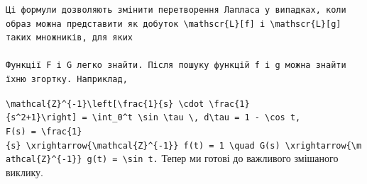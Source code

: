 \documentclass[
  ukrainian,
]{article}
\begin{document}
\begin{verbatim}
Ці формули дозволяють змінити перетворення Лапласа у випадках, коли образ можна представити як добуток \mathscr{L}[f] і \mathscr{L}[g] таких множників, для яких

Функції F і G легко знайти. Після пошуку функцій f і g можна знайти їхню згортку. Наприклад,
\end{verbatim}

\texttt{\textbackslash{}mathcal\{Z\}\^{}\{-1\}\textbackslash{}left{[}\textbackslash{}frac\{1\}\{s\}\ \textbackslash{}cdot\ \textbackslash{}frac\{1\}\{s\^{}2+1\}\textbackslash{}right{]}\ =\ \textbackslash{}int\_0\^{}t\ \textbackslash{}sin\ \textbackslash{}tau\ \textbackslash{},\ d\textbackslash{}tau\ =\ 1\ -\ \textbackslash{}cos\ t,}
\texttt{F(s)\ =\ \textbackslash{}frac\{1\}\{s\}\ \textbackslash{}xrightarrow\{\textbackslash{}mathcal\{Z\}\^{}\{-1\}\}\ f(t)\ =\ 1\ \textbackslash{}quad\ G(s)\ \textbackslash{}xrightarrow\{\textbackslash{}mathcal\{Z\}\^{}\{-1\}\}\ g(t)\ =\ \textbackslash{}sin\ t.}
Тепер ми готові до важливого змішаного виклику.
\end{document}
